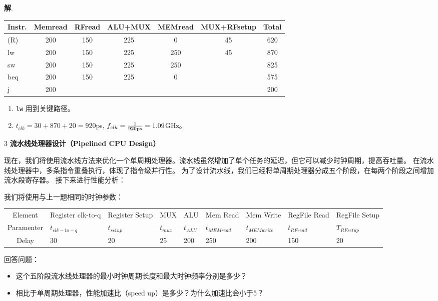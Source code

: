 \documentclass[12pt,a4paper]{article}
\newenvironment{problems}{\begin{list}{}{\renewcommand{\makelabel}[1]{\textbf{##1}.\hfil}}}{\end{list}}
\providecommand{\sol}{\textbf{解}.~}
\begin{document}
\begin{problems}
    \sol 

    \begin{tabular}{>{\ttfamily}l|ccccc|c}
        Instr. & Memread & RFread & ALU+MUX & MEMread & MUX+RFsetup & Total \\
        \hline
        (R)      & 200 & 150 & 225 & 0 & 45 & 620 \\
        lw       & 200 & 150 & 225 & 250 & 45 & 870 \\
        sw       & 200 & 150 & 225 & 250 &    & 825 \\
        beq      & 200 & 150 & 225 & 0   &    & 575 \\
        j        & 200 &     &     &     &    & 200  \\
        \hline
    \end{tabular}
    
    \begin{enumerate}
        \item \texttt{lw} 用到关键路径。
        \item $t_{clk}=30+870+20=920$ps, $f_{clk}=\frac{1}{\rm 920ps}=1.09$GHz。
    \end{enumerate}

    \item[3] \textbf{流水线处理器设计（Pipelined CPU Design）} 
    
    现在，我们将使用流水线方法来优化一个单周期处理器。流水线虽然增加了单个任务的延迟，但它可以减少时钟周期，提高吞吐量。 在流水线处理器中，多条指令重叠执行，体现了指令级并行性。
    为了设计流水线，我们已经将单周期处理器分成五个阶段，在每两个阶段之间增加流水段寄存器。
    接下来进行性能分析：

    我们将使用与上一题相同的时钟参数：

    \begin{tabular}{c|m{4em}m{4em}m{3em}m{3em}m{4em}m{4em}m{4em}m{4em}}
        Element & Register clk-to-q & Register Setup & MUX & ALU & Mem Read & Mem Write & RegFile Read & RegFile Setup\\
        Paramenter & $t_{clk-to-q}$ & $t_{setup}$ & $t_{mux}$ & $t_{ALU}$ & $t_{MEMread}$ & $t_{MEMwrite}$ & $t_{RFread}$ & $T_{RFsetup}$\\
        \hline
        Delay & 30 & 20 & 25 & 200 & 250 & 200 & 150 & 20 \\
        \hline
    \end{tabular}

    回答问题：
    \begin{itemize}
        \item 这个五阶段流水线处理器的最小时钟周期长度和最大时钟频率分别是多少？
        \item 相比于单周期处理器，性能加速比（speed up）是多少？为什么加速比会小于5？
    \end{itemize}


\end{problems}
\end{document}
